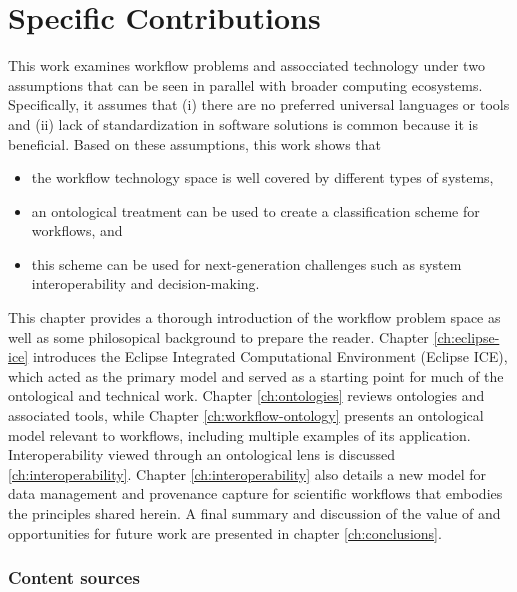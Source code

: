 \section{Specific Contributions}

This work examines workflow problems and assocciated technology under two
assumptions that can be seen in parallel with broader
computing ecosystems. Specifically, it assumes that (i) there are no preferred
universal languages or tools and (ii) lack of standardization
in software solutions is common because it is beneficial. Based
on these assumptions, this work shows that 
\begin{itemize}
  \item the workflow technology space is well covered by different types
  of systems,
  \item an ontological treatment can be used to create a classification scheme
  for workflows, and
  \item this scheme can be used for next-generation challenges such as system
  interoperability and decision-making.
\end{itemize}

This chapter provides a thorough introduction of the workflow problem space as
well as some philosopical background to prepare the reader. Chapter
\ref{ch:eclipse-ice} introduces the Eclipse Integrated Computational Environment
(Eclipse ICE), which acted as the primary model and served as a starting point
for much of the ontological and technical work. Chapter \ref{ch:ontologies}
reviews ontologies and associated tools, while Chapter
\ref{ch:workflow-ontology} presents an ontological model relevant to workflows,
including multiple examples of its application. Interoperability viewed through
an ontological lens is discussed \ref{ch:interoperability}. Chapter
\ref{ch:interoperability} also details a new model for data management and provenance
capture for scientific workflows that embodies the principles shared herein. A
final summary and discussion of the value of and opportunities for future work
are presented in chapter \ref{ch:conclusions}.

\subsubsection{Content sources}

